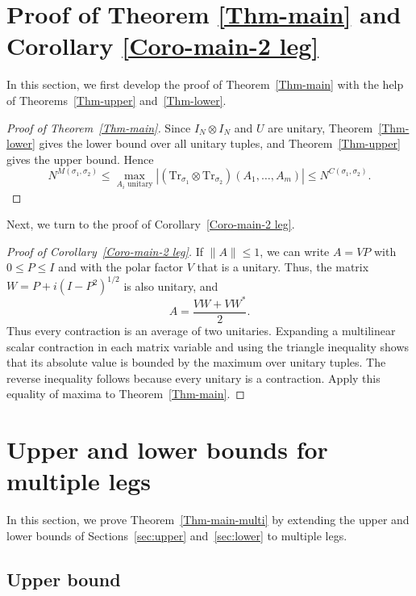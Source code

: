 \documentclass[12pt]{article}
\numberwithin{equation}{section}
\theoremstyle{plain}
\def\Tr{\mathrm {Tr}}
\begin{document}
\section{Proof of Theorem \ref{Thm-main} and Corollary \ref{Coro-main-2 leg}} \label{sec:2legs}

In this section, we first develop the proof of Theorem~\ref{Thm-main} with the help of Theorems~\ref{Thm-upper} and~\ref{Thm-lower}.

\begin{proof}[Proof of Theorem~\ref{Thm-main}]
Since $I_N\otimes I_N$ and $U$ are unitary, Theorem~\ref{Thm-lower} gives the lower bound over all unitary tuples, and Theorem~\ref{Thm-upper} gives the upper bound. Hence
\begin{equation}
N^{M(\sigma_1,\sigma_2)}
\le \max_{A_i\text{ unitary}}|(\Tr_{\sigma_1}\otimes\Tr_{\sigma_2})(A_1,\ldots,A_m)|
\le N^{C(\sigma_1,\sigma_2)}.
\end{equation}
\end{proof}

Next, we turn to the proof of Corollary~\ref{Coro-main-2 leg}.

\begin{proof}[Proof of Corollary~\ref{Coro-main-2 leg}]
If $\|A\|\le1$, we can write $A=VP$ with $0\le P\le I$ and with the polar factor $V$ that is a unitary. Thus, the matrix $W=P+i(I-P^2)^{1/2}$ is also unitary, and
\[
A=\frac{VW+VW^*}{2}.
\]
Thus every contraction is an average of two unitaries. Expanding a multilinear scalar contraction in each matrix variable and using the triangle inequality shows that its absolute value is bounded by the maximum over unitary tuples. The reverse inequality follows because every unitary is a contraction. Apply this equality of maxima to Theorem~\ref{Thm-main}.
\end{proof}

\section{Upper and lower bounds for multiple legs} \label{sec:multi-legs}

In this section, we prove Theorem~\ref{Thm-main-multi} by extending the upper and lower bounds of Sections~\ref{sec:upper} and~\ref{sec:lower} to multiple legs.

\subsection{Upper bound}
\end{document}
